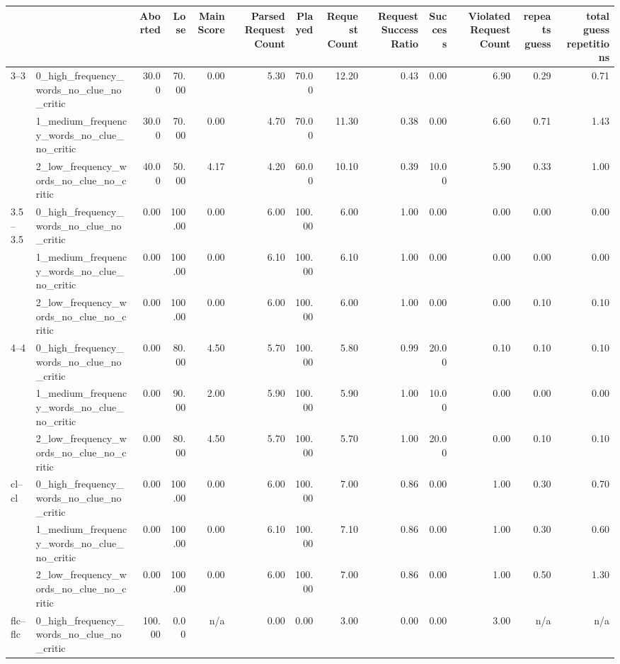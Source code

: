 \begin{tabular}{llrrrrrrrrrrr}
\toprule
 &  & Aborted & Lose & Main Score & Parsed Request Count & Played & Request Count & Request Success Ratio & Success & Violated Request Count & repeats guess & total guess repetitions \\
\midrule
\multirow[t]{3}{*}{3--3} & 0_high_frequency_words_no_clue_no_critic & 30.00 & 70.00 & 0.00 & 5.30 & 70.00 & 12.20 & 0.43 & 0.00 & 6.90 & 0.29 & 0.71 \\
 & 1_medium_frequency_words_no_clue_no_critic & 30.00 & 70.00 & 0.00 & 4.70 & 70.00 & 11.30 & 0.38 & 0.00 & 6.60 & 0.71 & 1.43 \\
 & 2_low_frequency_words_no_clue_no_critic & 40.00 & 50.00 & 4.17 & 4.20 & 60.00 & 10.10 & 0.39 & 10.00 & 5.90 & 0.33 & 1.00 \\
\cline{1-13}
\multirow[t]{3}{*}{3.5--3.5} & 0_high_frequency_words_no_clue_no_critic & 0.00 & 100.00 & 0.00 & 6.00 & 100.00 & 6.00 & 1.00 & 0.00 & 0.00 & 0.00 & 0.00 \\
 & 1_medium_frequency_words_no_clue_no_critic & 0.00 & 100.00 & 0.00 & 6.10 & 100.00 & 6.10 & 1.00 & 0.00 & 0.00 & 0.00 & 0.00 \\
 & 2_low_frequency_words_no_clue_no_critic & 0.00 & 100.00 & 0.00 & 6.00 & 100.00 & 6.00 & 1.00 & 0.00 & 0.00 & 0.10 & 0.10 \\
\cline{1-13}
\multirow[t]{3}{*}{4--4} & 0_high_frequency_words_no_clue_no_critic & 0.00 & 80.00 & 4.50 & 5.70 & 100.00 & 5.80 & 0.99 & 20.00 & 0.10 & 0.10 & 0.10 \\
 & 1_medium_frequency_words_no_clue_no_critic & 0.00 & 90.00 & 2.00 & 5.90 & 100.00 & 5.90 & 1.00 & 10.00 & 0.00 & 0.00 & 0.00 \\
 & 2_low_frequency_words_no_clue_no_critic & 0.00 & 80.00 & 4.50 & 5.70 & 100.00 & 5.70 & 1.00 & 20.00 & 0.00 & 0.10 & 0.10 \\
\cline{1-13}
\multirow[t]{3}{*}{cl--cl} & 0_high_frequency_words_no_clue_no_critic & 0.00 & 100.00 & 0.00 & 6.00 & 100.00 & 7.00 & 0.86 & 0.00 & 1.00 & 0.30 & 0.70 \\
 & 1_medium_frequency_words_no_clue_no_critic & 0.00 & 100.00 & 0.00 & 6.10 & 100.00 & 7.10 & 0.86 & 0.00 & 1.00 & 0.30 & 0.60 \\
 & 2_low_frequency_words_no_clue_no_critic & 0.00 & 100.00 & 0.00 & 6.00 & 100.00 & 7.00 & 0.86 & 0.00 & 1.00 & 0.50 & 1.30 \\
\cline{1-13}
\multirow[t]{3}{*}{flc--flc} & 0_high_frequency_words_no_clue_no_critic & 100.00 & 0.00 & n/a & 0.00 & 0.00 & 3.00 & 0.00 & 0.00 & 3.00 & n/a & n/a \\

\end{tabular}
